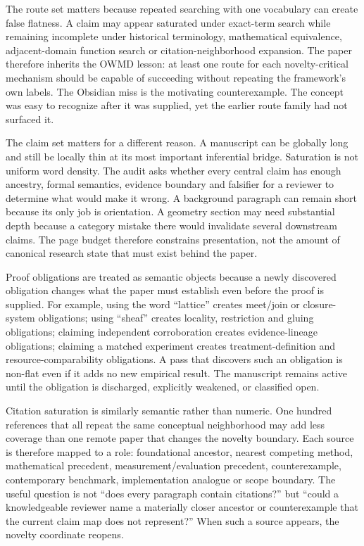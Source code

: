 The route set matters because repeated searching with one vocabulary can create false flatness. A claim may appear saturated under exact-term search while remaining incomplete under historical terminology, mathematical equivalence, adjacent-domain function search or citation-neighborhood expansion. The paper therefore inherits the OWMD lesson: at least one route for each novelty-critical mechanism should be capable of succeeding without repeating the framework's own labels. The Obsidian miss is the motivating counterexample. The concept was easy to recognize after it was supplied, yet the earlier route family had not surfaced it.

The claim set matters for a different reason. A manuscript can be globally long and still be locally thin at its most important inferential bridge. Saturation is not uniform word density. The audit asks whether every central claim has enough ancestry, formal semantics, evidence boundary and falsifier for a reviewer to determine what would make it wrong. A background paragraph can remain short because its only job is orientation. A geometry section may need substantial depth because a category mistake there would invalidate several downstream claims. The page budget therefore constrains presentation, not the amount of canonical research state that must exist behind the paper.

Proof obligations are treated as semantic objects because a newly discovered obligation changes what the paper must establish even before the proof is supplied. For example, using the word ``lattice'' creates meet/join or closure-system obligations; using ``sheaf'' creates locality, restriction and gluing obligations; claiming independent corroboration creates evidence-lineage obligations; claiming a matched experiment creates treatment-definition and resource-comparability obligations. A pass that discovers such an obligation is non-flat even if it adds no new empirical result. The manuscript remains active until the obligation is discharged, explicitly weakened, or classified open.

Citation saturation is similarly semantic rather than numeric. One hundred references that all repeat the same conceptual neighborhood may add less coverage than one remote paper that changes the novelty boundary. Each source is therefore mapped to a role: foundational ancestor, nearest competing method, mathematical precedent, measurement/evaluation precedent, counterexample, contemporary benchmark, implementation analogue or scope boundary. The useful question is not ``does every paragraph contain citations?'' but ``could a knowledgeable reviewer name a materially closer ancestor or counterexample that the current claim map does not represent?'' When such a source appears, the novelty coordinate reopens.

